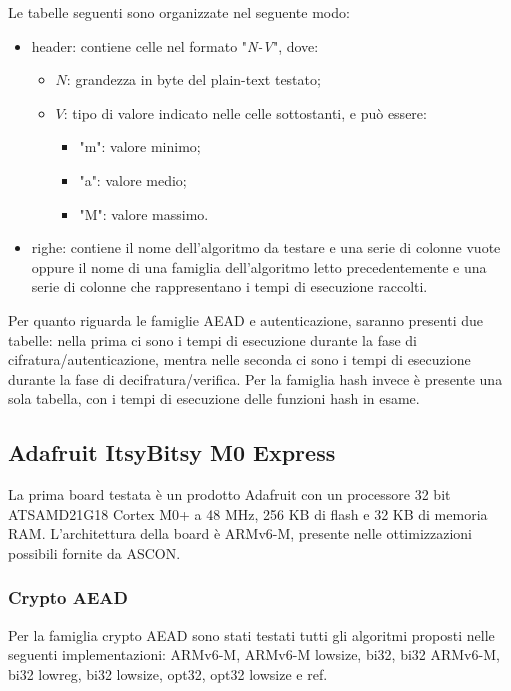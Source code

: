 \documentclass[12pt,a4paper,italian]{report}
\begin{document}
\noindent Le tabelle seguenti sono organizzate nel seguente modo:
\begin{itemize}
    \item header: contiene celle nel formato "\textit{N-V}", dove:
    \begin{itemize}
        \item $N$: grandezza in byte del plain-text testato;
        \item $V$: tipo di valore indicato nelle celle sottostanti, e può essere:
        \begin{itemize}
            \item "m": valore minimo;
            \item "a": valore medio;
            \item "M": valore massimo.
        \end{itemize}
    \end{itemize}
    \item righe: contiene il nome dell'algoritmo da testare e una serie di colonne vuote oppure il nome di una famiglia dell'algoritmo letto precedentemente e una serie di colonne che rappresentano i tempi di esecuzione raccolti.
\end{itemize}

\noindent Per quanto riguarda le famiglie AEAD e autenticazione, saranno presenti due tabelle: nella prima ci sono i tempi di esecuzione durante la fase di cifratura/autenticazione, mentra nelle seconda ci sono i tempi di esecuzione durante la fase di decifratura/verifica. Per la famiglia hash invece è presente una sola tabella, con i tempi di esecuzione delle funzioni hash in esame.

\subsection{Adafruit ItsyBitsy M0 Express}

La prima board testata è un prodotto Adafruit con un processore 32 bit ATSAMD21G18 Cortex M0+ a 48 MHz, 256 KB di flash e 32 KB di memoria RAM.\cite{adafruit} L'architettura della board è ARMv6-M, presente nelle ottimizzazioni possibili fornite da ASCON.\cite{arm}

\subsubsection{Crypto AEAD}

Per la famiglia crypto AEAD sono stati testati tutti gli algoritmi proposti nelle seguenti implementazioni: ARMv6-M, ARMv6-M lowsize, bi32, bi32 ARMv6-M, bi32 lowreg, bi32 lowsize, opt32, opt32 lowsize e ref.
\end{document}
